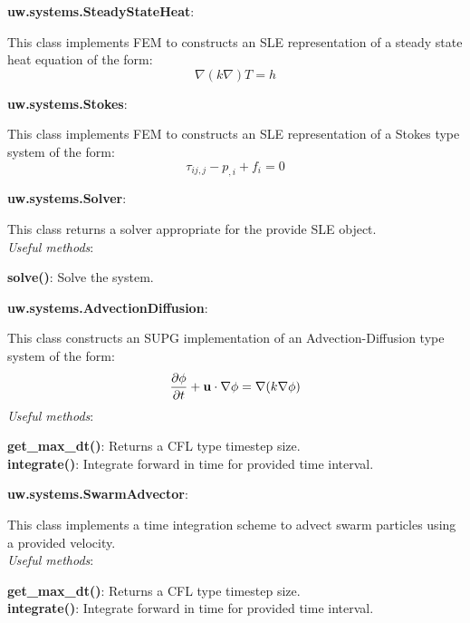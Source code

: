 \documentclass[10pt,landscape]{article}
\begin{document}
\begin{multicols}{2}
\noindent\textbf{uw.systems.SteadyStateHeat}:
\begin{addmargin}[1em]{2em}
This class implements FEM to constructs an SLE representation of a steady state heat equation of the form:
 \[\nabla(k \nabla)T = h\]
\end{addmargin}
\vspace{1mm}

\noindent\textbf{uw.systems.Stokes}:
\begin{addmargin}[1em]{2em}
This class implements FEM to constructs an SLE representation of a Stokes type system of the form:
 \[\tau_{ij,j} -  p_{,i} + f_i = 0\]
\end{addmargin}
\vspace{1mm}

\noindent\textbf{uw.systems.Solver}:
\begin{addmargin}[1em]{2em}
This class returns a solver appropriate for the provide SLE object.\\
\vspace{1mm}
\textit{Useful methods}:\\
\begin{addmargin}[1em]{2em}
\textbf{solve()}: Solve the system.\\
\end{addmargin}
\end{addmargin}
\vspace{1mm}

\noindent\textbf{uw.systems.AdvectionDiffusion}:
\begin{addmargin}[1em]{2em}
This class constructs an SUPG implementation of an Advection-Diffusion type system of the form:
 \[\frac{\partial\phi}{\partial t}  + {\bf u } \cdot \nabla \phi= \nabla { ( k  \nabla \phi } )\]
\textit{Useful methods}:\\
\begin{addmargin}[1em]{2em}
\textbf{get\_max\_dt()}: Returns a CFL type timestep size.\\
\textbf{integrate()}: Integrate forward in time for provided time interval.\\
\end{addmargin}
\end{addmargin}
\vspace{1mm}

\noindent\textbf{uw.systems.SwarmAdvector}:
\begin{addmargin}[1em]{2em}
This class implements a time integration scheme to advect swarm particles using a provided velocity.\\
\vspace{1mm}
\textit{Useful methods}:\\
\begin{addmargin}[1em]{2em}
\textbf{get\_max\_dt()}: Returns a CFL type timestep size.\\
\textbf{integrate()}: Integrate forward in time for provided time interval.\\
\end{addmargin}
\end{addmargin}
\vspace{1mm}


\end{multicols}
\end{document}
